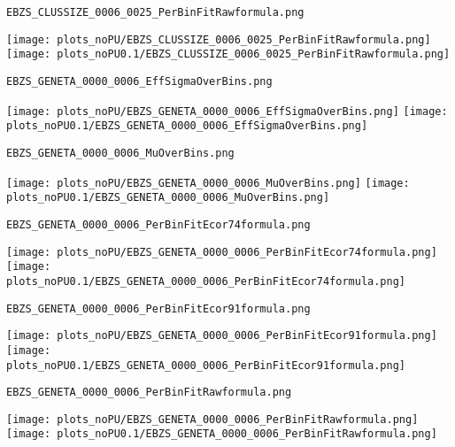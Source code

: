 \begin{frame}[fragile]
\begin{verbatim}
EBZS_CLUSSIZE_0006_0025_PerBinFitRawformula.png
\end{verbatim}
\texttt{[image: plots\_noPU/EBZS\_CLUSSIZE\_0006\_0025\_PerBinFitRawformula.png]}
\texttt{[image: plots\_noPU0.1/EBZS\_CLUSSIZE\_0006\_0025\_PerBinFitRawformula.png]}
\end{frame}
\begin{frame}[fragile]
\begin{verbatim}
EBZS_GENETA_0000_0006_EffSigmaOverBins.png
\end{verbatim}
\texttt{[image: plots\_noPU/EBZS\_GENETA\_0000\_0006\_EffSigmaOverBins.png]}
\texttt{[image: plots\_noPU0.1/EBZS\_GENETA\_0000\_0006\_EffSigmaOverBins.png]}
\end{frame}
\begin{frame}[fragile]
\begin{verbatim}
EBZS_GENETA_0000_0006_MuOverBins.png
\end{verbatim}
\texttt{[image: plots\_noPU/EBZS\_GENETA\_0000\_0006\_MuOverBins.png]}
\texttt{[image: plots\_noPU0.1/EBZS\_GENETA\_0000\_0006\_MuOverBins.png]}
\end{frame}
\begin{frame}[fragile]
\begin{verbatim}
EBZS_GENETA_0000_0006_PerBinFitEcor74formula.png
\end{verbatim}
\texttt{[image: plots\_noPU/EBZS\_GENETA\_0000\_0006\_PerBinFitEcor74formula.png]}
\texttt{[image: plots\_noPU0.1/EBZS\_GENETA\_0000\_0006\_PerBinFitEcor74formula.png]}
\end{frame}
\begin{frame}[fragile]
\begin{verbatim}
EBZS_GENETA_0000_0006_PerBinFitEcor91formula.png
\end{verbatim}
\texttt{[image: plots\_noPU/EBZS\_GENETA\_0000\_0006\_PerBinFitEcor91formula.png]}
\texttt{[image: plots\_noPU0.1/EBZS\_GENETA\_0000\_0006\_PerBinFitEcor91formula.png]}
\end{frame}
\begin{frame}[fragile]
\begin{verbatim}
EBZS_GENETA_0000_0006_PerBinFitRawformula.png
\end{verbatim}
\texttt{[image: plots\_noPU/EBZS\_GENETA\_0000\_0006\_PerBinFitRawformula.png]}
\texttt{[image: plots\_noPU0.1/EBZS\_GENETA\_0000\_0006\_PerBinFitRawformula.png]}
\end{frame}
